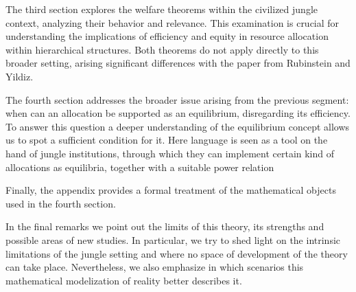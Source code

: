 \documentclass[12pt,a4paper]{article}
\numberwithin{theorem}{section}
\numberwithin{definition}{section}
\numberwithin{example}{section}
\numberwithin{exercise}{section}
\begin{document}
The third section explores the welfare theorems within the civilized jungle context, analyzing their behavior and relevance. This examination is crucial for understanding the implications of efficiency and equity in resource allocation within hierarchical structures. Both theorems do not apply directly to this broader setting, arising significant differences with the paper from Rubinstein and Yildiz.

The fourth section addresses the broader issue arising from the previous segment: when can an allocation be supported as an equilibrium, disregarding its efficiency. To answer this question a deeper understanding of the equilibrium concept allows us to spot a sufficient condition for it. Here language is seen as a tool on the hand of jungle institutions, through which they can implement certain kind of allocations as equilibria, together with a suitable power relation     


Finally, the appendix provides a formal treatment of the mathematical objects used in the fourth section. 

In the final remarks we point out the limits of this theory, its strengths and possible areas of new studies. In particular, we try to shed light on the intrinsic limitations of the jungle setting and where no space of development of the theory can take place. Nevertheless, we also emphasize in which scenarios this mathematical modelization of reality better describes it.




\end{document}
